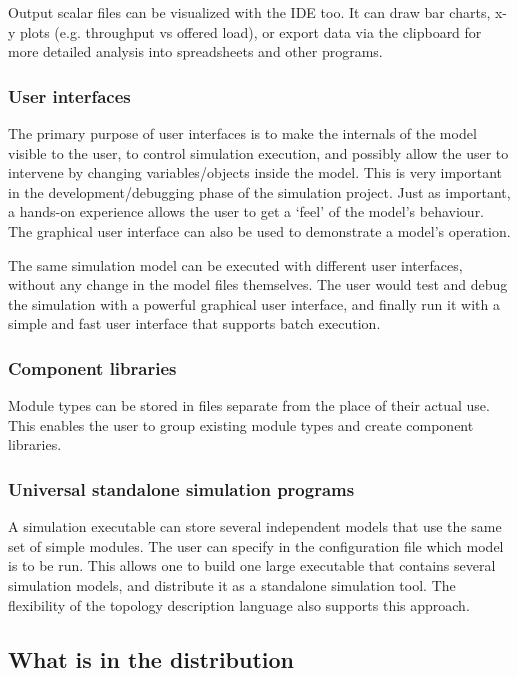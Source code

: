 Output scalar files can be visualized with the {\opp} IDE too.
It can draw bar charts, x-y plots (e.g. throughput vs offered load),
or export data via the clipboard for more detailed analysis into
spreadsheets and other programs.


\subsubsection{User interfaces}

The primary purpose of user interfaces is to make the internals
of the model visible to the user, to control simulation execution,
and possibly allow the user to intervene by changing variables/objects
inside the model. This is very important in the development/debugging
phase of the simulation project. Just as important, a hands-on
experience allows the user to get a `feel' of the model's
behaviour. The graphical user interface can also be used to
demonstrate a model's operation.


The same simulation model can be executed with different user
interfaces, without any change in the model files themselves.
The user would test and debug the simulation with a powerful
graphical user interface, and finally run it with a simple and
fast user interface that supports batch execution.


\subsubsection{Component libraries}

Module types can be stored in files separate from the place
of their actual use. This enables the user to group existing
module types and create component libraries.


\subsubsection{Universal standalone simulation programs}


A simulation executable can store several independent models
that use the same set of simple modules. The user can specify
in the configuration file which model is to be run. This
allows one to build one large executable that contains several
simulation models, and distribute it as a standalone simulation
tool. The flexibility of the topology description language also
supports this approach.


\subsection{What is in the distribution}

